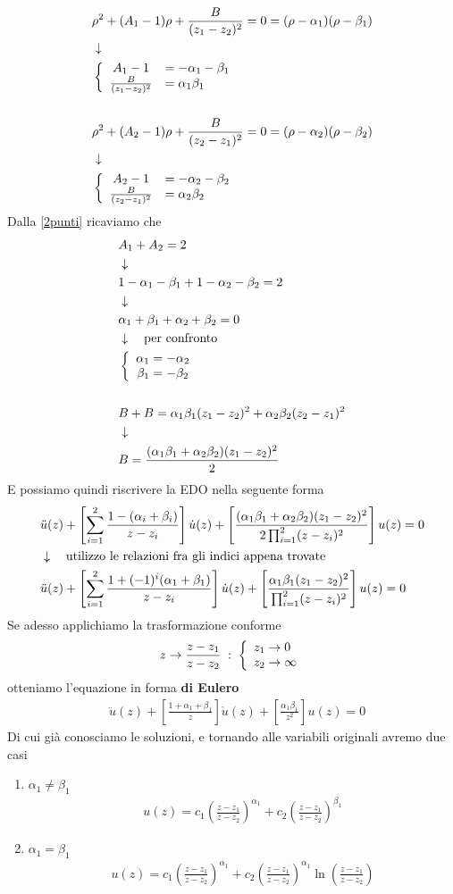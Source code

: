 \begin{align}
	&\rho^2 + (A_1 -1)\rho + \frac{B}{(z_1-z_2)^2} = 0 = (\rho - \alpha_1)(\rho - \beta_1) \firstpassage
	& \double{A_1 -1 &= - \alpha_1-\beta_1}{\frac{B}{(z_1-z_2)^2} &= \alpha_1 \beta_1\hfill} \\
	\nonumber \\
	&\rho^2 + (A_2 -1)\rho + \frac{B}{(z_2-z_1)^2} = 0 = (\rho - \alpha_2)(\rho - \beta_2) \firstpassage
	& \double{A_2 -1 &= - \alpha_2-\beta_2}{\frac{B}{(z_2-z_1)^2} &= \alpha_2 \beta_2\hfill}	
\end{align}
Dalla \ref{2punti} ricaviamo che
\begin{align}
	&A_1 + A_2 = 2 \\ &\downarrow \nonumber \\
	&1 - \alpha_1-\beta_1 + 1 - \alpha_2-\beta_2 =2\nonumber \\ &\downarrow \nonumber \\
	&\alpha_1+ \beta_1 + \alpha_2 + \beta_2 =0 \nonumber \\ &\downarrow \quad \text{per confronto} \nonumber \\
	&\left\{ \begin{array}{cc} \alpha_1 = - \alpha_2\\ \beta_1 = - \beta_2 \end{array} \right.\\
	\nonumber \\
	&B + B = \alpha_1\beta_1 (z_1-z_2)^2 + \alpha_2\beta_2 (z_2-z_1)^2 \\ &\downarrow \nonumber \\
	& B = \frac{(\alpha_1\beta_1 + \alpha_2\beta_2)(z_1-z_2)^2 }{2}
\end{align}
E possiamo quindi riscrivere la EDO nella seguente forma
\begin{align}
	&\ddot{u}(z) + \left[ \sum_{i=1}^{2} \frac{1-( \alpha_i + \beta_i)}{z-z_i} \right] \dot{u}(z) + \left[ \frac{(\alpha_1\beta_1 + \alpha_2\beta_2)(z_1-z_2)^2}{2\prod_{i=1}^2 (z-z_i)^2} \right] u(z) =0 \\ &\downarrow \quad \text{utilizzo le relazioni fra gli indici appena trovate} \nonumber \\
	&\ddot{u}(z) + \left[ \sum_{i=1}^{2} \frac{1+ (-1)^i (\alpha_1 + \beta_1)}{z-z_i} \right] \dot{u}(z) + \left[ \frac{\alpha_1\beta_1(z_1-z_2)^2}{\prod_{i=1}^2 (z-z_i)^2} \right] u(z) =0 
\end{align}
Se adesso applichiamo la trasformazione conforme
\begin{align}
	z \to \frac{z-z_1}{z-z_2} \taleche \double{z_1 \to 0\hfill}{z_2 \to \infty}
\end{align}
otteniamo l'equazione in forma \textbf{di Eulero}
\begin{align}
	&\ddot{u}(z) + \left[ \frac{1+ \alpha_1 + \beta_1}{z} \right] \dot{u}(z) + \left[ \frac{\alpha_1\beta_1}{z^2} \right] u(z) =0 
\end{align}
Di cui già conosciamo le soluzioni, e tornando alle variabili originali avremo due casi
\begin{enumerate}
	\item $\alpha_1 \neq \beta_1$
		\begin{align}
			u(z) = c_1\left(\frac{z-z_1}{z-z_2}\right)^{\alpha_1} + c_2\left(\frac{z-z_1}{z-z_2}\right)^{\beta_1}
		\end{align}
	\item $\alpha_1 = \beta_1$
		\begin{align}
			u(z) = c_1\left(\frac{z-z_1}{z-z_2}\right)^{\alpha_1} + 	c_2\left(\frac{z-z_1}{z-z_2}\right)^{\alpha_1}\ln\left(\frac{z-z_1}{z-z_2}\right)
		\end{align}
\end{enumerate}


